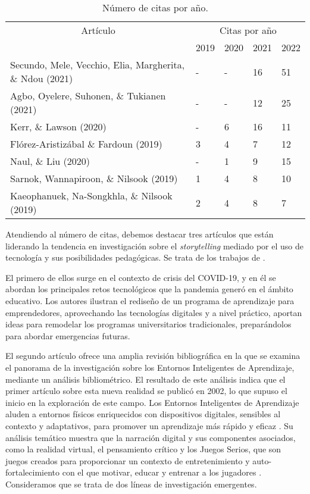 \begin{table}[htbp]
\centering
\begin{threeparttable}
\caption{Número de citas por año.}
\label{tab-02}
\begin{tabular}{lllll}
\toprule
\multicolumn{1}{c}{Artículo} & \multicolumn{4}{c}{Citas por año} \\
  &2019& 2020& 2021& 2022\\
\midrule
Secundo, Mele, Vecchio, Elia, Margherita, \& Ndou (2021) &-& - &16& 51\\
Agbo, Oyelere, Suhonen, \& Tukianen (2021)& -& - &12 &25\\
Kerr, \& Lawson (2020)& - &6& 16 &11\\
Flórez-Aristizábal \& Fardoun (2019)& 3& 4 &7& 12\\
Naul, \& Liu (2020) &- &1& 9& 15\\
Sarnok, Wannapiroon, \& Nilsook (2019) &1 &4& 8& 10\\
Kaeophanuek, Na-Songkhla, \& Nilsook (2019) & 2 & 4& 8& 7\\
\bottomrule
\end{tabular}
\end{threeparttable}
\end{table}

Atendiendo al número de citas, debemos destacar tres artículos que están
liderando la tendencia en investigación sobre el \emph{storytelling}
mediado por el uso de tecnología y sus posibilidades pedagógicas. Se
trata de los trabajos de \cite{secundo_threat_2021,agbo_scientific_2021,kerr_augmented_2020}.

El primero de ellos surge en el contexto de crisis del COVID-19, y en él
se abordan los principales retos tecnológicos que la pandemia generó en
el ámbito educativo. Los autores ilustran el rediseño de un programa de
aprendizaje para emprendedores, aprovechando las tecnologías digitales y
a nivel práctico, aportan ideas para remodelar los programas
universitarios tradicionales, preparándolos para abordar emergencias
futuras.

El segundo artículo ofrece una amplia revisión bibliográfica en la que
se examina el panorama de la investigación sobre los Entornos
Inteligentes de Aprendizaje, mediante un análisis bibliométrico. El
resultado de este análisis indica que el primer artículo sobre esta
nueva realidad se publicó en 2002, lo que supuso el inicio en la
exploración de este campo. Los Entornos Inteligentes de Aprendizaje
aluden a entornos físicos enriquecidos con dispositivos digitales,
sensibles al contexto y adaptativos, para promover un aprendizaje más
rápido y eficaz \cite{koper_conditions_2014}. Su análisis temático muestra que la narración digital y sus componentes asociados, como la realidad virtual, el pensamiento crítico y los Juegos Serios, que son juegos creados para proporcionar un contexto de entretenimiento y auto-fortalecimiento con
el que motivar, educar y entrenar a los jugadores  \cite{chipia_lobo_juegos_2011}. Consideramos que se trata de dos líneas de investigación emergentes.

